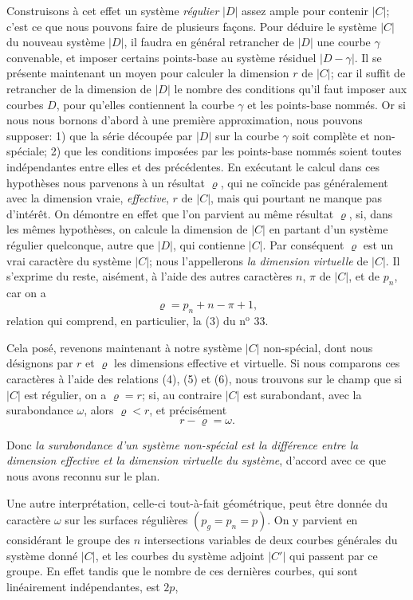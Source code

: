 \documentclass{article}
\begin{document}
Construisons à cet effet un système \emph{régulier} $|D|$ assez ample pour contenir $|C|$; c'est ce que nous pouvons faire de plusieurs façons. Pour déduire le système $|C|$ du nouveau système $|D|$, il faudra en général retrancher de $|D|$ une courbe $\gamma$ convenable, et imposer certains points-base au système résiduel $|D-\gamma|$. Il se présente maintenant un moyen pour calculer la dimension $r$ de $|C|$; car il suffit de retrancher de la dimension de $|D|$ le nombre des conditions qu'il faut imposer aux courbes $D$, pour qu'elles contiennent la courbe $\gamma$ et les points-base nommés. Or si nous nous bornons d'abord à une première approximation, nous pouvons supposer: 1) que la série découpée par $|D|$ sur la courbe $\gamma$ soit complète et non-spéciale; 2) que les conditions imposées par les points-base nommés soient toutes indépendantes entre elles et des précédentes. En exécutant le calcul dans ces hypothèses nous parvenons à un résultat $\varrho$, qui ne coïncide pas généralement avec la dimension vraie, \emph{effective}, $r$ de $|C|$, mais qui pourtant ne manque pas d'intérêt. On démontre en effet que l'on parvient au même résultat $\varrho$, si, dans les mêmes hypothèses, on calcule la dimension de $|C|$ en partant d'un système régulier quelconque, autre que $|D|$, qui contienne $|C|$. Par conséquent $\varrho$ est un vrai caractère du système $|C|$; nous l'appellerons \emph{la dimension virtuelle} de $|C|$. Il s'exprime du reste, aisément, à l'aide des autres caractères $n$, $\pi$ de $|C|$, et de $p_{n}$, car on a
\[ \varrho = p_{n} + n - \pi + 1, \tag{6} \]
relation qui comprend, en particulier, la (3) du n${}^{\text{o}}$ 33.

Cela posé, revenons maintenant à notre système $|C|$ non-spécial, dont nous désignons par $r$ et $\varrho$ les dimensions effective et virtuelle. Si nous comparons ces caractères à l'aide des relations (4), (5) et (6), nous trouvons sur le champ que si $|C|$ est régulier, on a $\varrho = r$; si, au contraire $|C|$ est surabondant, avec la surabondance $\omega$, alors $\varrho < r$, et précisément
\[ r - \varrho = \omega. \]

Donc \emph{la surabondance d'un système non-spécial est la différence entre la dimension effective et la dimension virtuelle du système}, d'accord avec ce que nous avons reconnu sur le plan.

Une autre interprétation, celle-ci tout-à-fait géométrique, peut être donnée du caractère $\omega$ sur les surfaces régulières $(p_{g} = p_{n} = p)$. On y parvient en considérant le groupe des $n$ intersections variables de deux courbes générales du système donné $|C|$, et les courbes du système adjoint $|C'|$ qui passent par ce groupe. En effet tandis que le nombre de ces dernières courbes, qui sont linéairement indépendantes, est $2p$,
\end{document}
